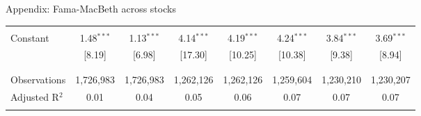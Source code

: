 \documentclass{beamer}
\begin{document}
{\begin{frame}{Appendix: Fama-MacBeth across stocks}
\begin{table}[!htbp]
\begin{tabular}{@{\extracolsep{-4pt}}lccccccc}
  & & & & & & & \\ 
 Constant & 1.48$^{***}$ & 1.13$^{***}$ & 4.14$^{***}$ & 4.19$^{***}$ & 4.24$^{***}$ & 3.84$^{***}$ & 3.69$^{***}$ \\ 
  & [8.19] & [6.98] & [17.30] & [10.25] & [10.38] & [9.38] & [8.94] \\ 
  & & & & & & & \\ 
\hline \\[-1.8ex] 
Observations & 1,726,983 & 1,726,983 & 1,262,126 & 1,262,126 & 1,259,604 & 1,230,210 & 1,230,207 \\ 
Adjusted R$^{2}$ & 0.01 & 0.04 & 0.05 & 0.06 & 0.07 & 0.07 & 0.07 \\ 
\hline 
\hline \\[-1.8ex] 
\end{tabular} 
\end{table}
\end{frame}
}
\end{document}
